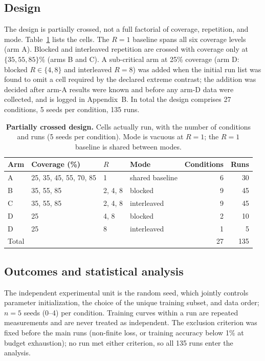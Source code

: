 \documentclass[10pt]{article}
\begin{document}
\subsection{Design}
\label{sec:design}

The design is partially crossed, not a full factorial of coverage, repetition, and mode. Table~\ref{tab:design} lists the cells. The $R=1$ baseline spans all six coverage levels (arm A). Blocked and interleaved repetition are crossed with coverage only at $\{35,55,85\}\%$ (arms B and C). A sub-critical arm at 25\% coverage (arm D: blocked $R \in \{4,8\}$ and interleaved $R=8$) was added when the initial run list was found to omit a cell required by the declared extreme contrast; the addition was decided after arm-A results were known and before any arm-D data were collected, and is logged in Appendix~B. In total the design comprises 27 conditions, 5 seeds per condition, 135 runs.

\begin{table}[t]
\centering
\caption{\textbf{Partially crossed design.} Cells actually run, with the number of conditions and runs (5 seeds per condition). Mode is vacuous at $R=1$; the $R=1$ baseline is shared between modes.}
\label{tab:design}
\small
\begin{tabular}{llllrr}
\toprule
Arm & Coverage (\%) & $R$ & Mode & Conditions & Runs \\
\midrule
A & 25, 35, 45, 55, 70, 85 & 1 & shared baseline & 6 & 30 \\
B & 35, 55, 85 & 2, 4, 8 & blocked & 9 & 45 \\
C & 35, 55, 85 & 2, 4, 8 & interleaved & 9 & 45 \\
D & 25 & 4, 8 & blocked & 2 & 10 \\
D & 25 & 8 & interleaved & 1 & 5 \\
\midrule
\multicolumn{3}{l}{Total} & & 27 & 135 \\
\bottomrule
\end{tabular}
\end{table}

\subsection{Outcomes and statistical analysis}
\label{sec:outcomes}

The independent experimental unit is the random seed, which jointly controls parameter initialization, the choice of the unique training subset, and data order; $n=5$ seeds (0--4) per condition. Training curves within a run are repeated measurements and are never treated as independent. The exclusion criterion was fixed before the main runs (non-finite loss, or training accuracy below 1\% at budget exhaustion); no run met either criterion, so all 135 runs enter the analysis.
\end{document}
